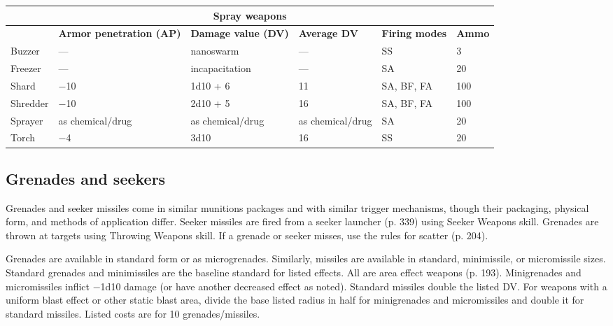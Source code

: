\begin{table} \begin{tabularx}{\textwidth}{|l|X|l|l|l|l|} \hline

\multicolumn{6}{|c|}{\textbf{Spray weapons}} \\ \hline

&\textbf{Armor penetration (AP)}	&\textbf{Damage value (DV)}	&\textbf{Average DV}	&\textbf{Firing modes}	&\textbf{Ammo} \\ \hline

Buzzer	&--- &nanoswarm	&--- &SS	&3 \\ \hline

Freezer	&--- &incapacitation	&--- &SA	&20 \\ \hline

Shard	&$-$10	&1d10 + 6	&11	&SA, BF, FA	&100 \\ \hline

Shredder	&$-$10	&2d10 + 5	&16	&SA, BF, FA	&100 \\ \hline

Sprayer	&as chemical/drug	&as chemical/drug	&as chemical/drug	&SA	&20 \\ \hline

Torch	&$-$4	&3d10	&16	&SS	&20 \\ \hline

\end{tabularx} \label{tab:spray-weapons} \end{table} 

\subsection{Grenades and seekers} \label{sec:grenades-seekers} 

Grenades and seeker missiles come in similar munitions packages and with similar trigger mechanisms, though their packaging, physical form, and methods of application differ. Seeker missiles are fired from a seeker launcher (p. 339) using Seeker Weapons skill. Grenades are thrown at targets using Throwing Weapons skill. If a grenade or seeker misses, use the rules for scatter (p. 204). 

Grenades are available in standard form or as microgrenades. Similarly, missiles are available in standard, minimissile, or micromissile sizes. Standard grenades and minimissiles are the baseline standard for listed effects. All are area effect weapons (p. 193). Minigrenades and micromissiles inflict $-$1d10 damage (or have another decreased effect as noted). Standard missiles double the listed DV. For weapons with a uniform blast effect or other static blast area, divide the base listed radius in half for minigrenades and micromissiles and double it for standard missiles. Listed costs are for 10 grenades/missiles. 

